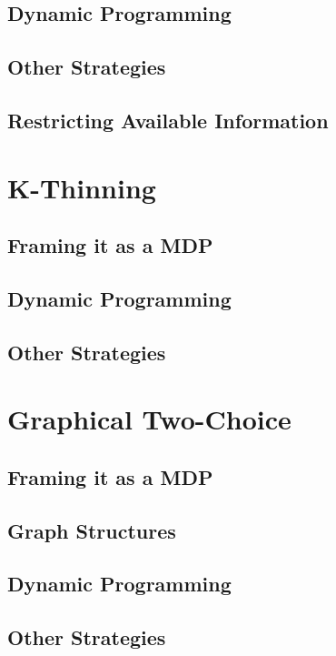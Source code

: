 \subsection{Dynamic Programming}


\subsection{Other Strategies}


\subsection{Restricting Available Information}


\section{K-Thinning}


\subsection{Framing it as a MDP}


\subsection{Dynamic Programming}


\subsection{Other Strategies}


\section{Graphical Two-Choice}


\subsection{Framing it as a MDP}


\subsection{Graph Structures}


\subsection{Dynamic Programming}


\subsection{Other Strategies}


